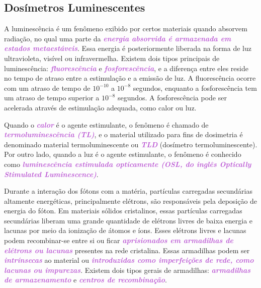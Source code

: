 \documentclass[11pt,a4paper]{article}
\begin{document}
\subsection*{Dosímetros Luminescentes}

	A luminescência é um fenômeno exibido por certos materiais quando absorvem radiação, no qual uma parte da \textcolor{MediumOrchid}{\textit{\textbf{energia absorvida é armazenada em estados metaestáveis}}}. Essa energia é posteriormente liberada na forma de luz ultravioleta, visível ou infravermelha. Existem dois tipos principais de luminescência: \textcolor{MediumOrchid}{\textit{\textbf{fluorescência}}} e \textcolor{MediumOrchid}{\textit{\textbf{fosforescência}}}, e a diferença entre eles reside no tempo de atraso entre a estimulação e a emissão de luz. A fluorescência ocorre com um atraso de tempo de $10^{-10}$ a $10^{-8}$ segundos, enquanto a fosforescência tem um atraso de tempo superior a $10^{-8}$ segundos. A fosforescência pode ser acelerada através de estimulação adequada, como calor ou luz.

	Quando o \textcolor{MediumOrchid}{\textit{\textbf{calor}}} é o agente estimulante, o fenômeno é chamado de \textcolor{MediumOrchid}{\textit{\textbf{termoluminescência (TL)}}}, e o material utilizado para fins de dosimetria é denominado material termoluminescente ou \textcolor{MediumOrchid}{\textit{\textbf{TLD}}} (dosímetro termoluminescente). Por outro lado, quando a luz é o agente estimulante, o fenômeno é conhecido como \textcolor{MediumOrchid}{\textit{\textbf{luminescência estimulada opticamente (OSL, do inglês \textit{Optically Stimulated Luminescence})}}}.

	Durante a interação dos fótons com a matéria, partículas carregadas secundárias altamente energéticas, principalmente elétrons, são responsáveis pela deposição de energia do fóton. Em materiais sólidos cristalinos, essas partículas carregadas secundárias liberam uma grande quantidade de elétrons livres de baixa energia e lacunas por meio da ionização de átomos e íons. Esses elétrons livres e lacunas podem recombinar-se entre si ou ficar \textcolor{MediumOrchid}{\textit{\textbf{aprisionados em armadilhas de elétrons ou lacunas}}} presentes na rede cristalina. Essas armadilhas podem ser \textcolor{MediumOrchid}{\textit{\textbf{intrínsecas}}} ao material ou \textcolor{MediumOrchid}{\textit{\textbf{introduzidas como imperfeições de rede, como lacunas ou impurezas}}}. Existem dois tipos gerais de armadilhas: \textcolor{MediumOrchid}{\textit{\textbf{armadilhas de armazenamento}}} e \textcolor{MediumOrchid}{\textit{\textbf{centros de recombinação}}}.
\end{document}
